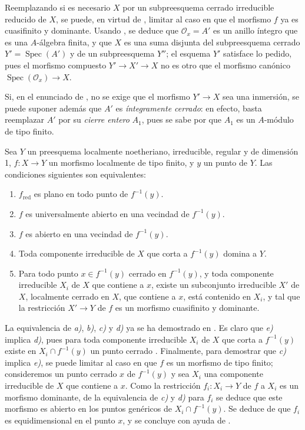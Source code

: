 Reemplazando si es necesario $X$ por un subpreesquema cerrado irreducible reducido de $X$, se puede, en virtud de , limitar al caso en que el morfismo $f$ ya es cuasifinito y dominante.
Usando , se deduce que $\mathcal O_x=A'$ es un anillo íntegro que es una $A$-álgebra finita, y que $X$ es una suma disjunta del subpreesquema cerrado $Y'=\operatorname{Spec}(A')$ y de un subpreesquema $Y''$; el esquema $Y'$ satisface lo pedido, pues el morfismo compuesto $Y'\to X'\to X$ no es otro que el morfismo canónico $\operatorname{Spec}(\mathcal O_x)\to X$.

\begin{remark}[14.5.5]
\label{IV.14.5.5}
Si, en el enunciado de , no se exige que el morfismo $Y'\to X$ sea una inmersión, se puede suponer además que $A'$ es \emph{íntegramente cerrado}: en efecto, basta reemplazar $A'$ por su \emph{cierre entero} $A_1$, pues se sabe por  que $A_1$ es un $A$-módulo de tipo finito.
\end{remark}

\begin{proposition}[14.5.6]
\label{IV.14.5.6}
Sea $Y$ un preesquema localmente noetheriano, irreducible, regular y de dimensión 1, $f:X\to Y$ un morfismo localmente de tipo finito, y $y$ un punto de $Y$.
Las condiciones siguientes son equivalentes:
\begin{enumerate}[label=\emph{\alph*)}]
  \item $f_{\mathrm{red}}$ es plano en todo punto de $f^{-1}(y)$.
  \item $f$ es universalmente abierto en una vecindad de $f^{-1}(y)$.
  \item $f$ es abierto en una vecindad de $f^{-1}(y)$.
  \item Toda componente irreducible de $X$ que corta a $f^{-1}(y)$ domina a $Y$.
  \item Para todo punto $x\in f^{-1}(y)$ cerrado en $f^{-1}(y)$, y toda componente irreducible $X_i$ de $X$ que contiene a $x$, existe un subconjunto irreducible $X'$ de $X$, localmente cerrado en $X$, que contiene a $x$, está contenido en $X_i$, y tal que la restricción $X'\to Y$ de $f$ es un morfismo cuasifinito y dominante.
\end{enumerate}
\end{proposition}

La equivalencia de \emph{a)}, \emph{b)}, \emph{c)} y \emph{d)} ya se ha demostrado en .
Es claro que \emph{e)} implica \emph{d)}, pues para toda componente irreducible $X_i$ de $X$ que corta a $f^{-1}(y)$ existe en $X_i\cap f^{-1}(y)$ un punto cerrado .
Finalmente, para demostrar que \emph{c)} implica \emph{e)}, se puede limitar al caso en que $f$ es un morfismo de tipo finito; consideremos un punto cerrado $x$ de $f^{-1}(y)$ y sea $X_i$ una componente irreducible de $X$ que contiene a $x$.
Como la restricción $f_i:X_i\to Y$ de $f$ a $X_i$ es un morfismo dominante, de la equivalencia de \emph{c)} y \emph{d)} para $f_i$ se deduce que este morfismo es abierto en los puntos genéricos de $X_i\cap f^{-1}(y)$. Se deduce de  que $f_i$ es equidimensional en el punto $x$, y se concluye con ayuda de .

